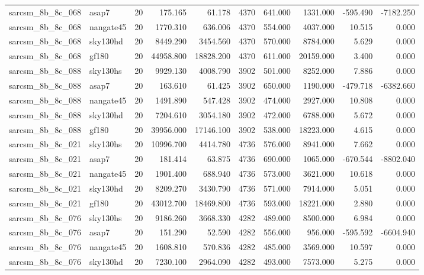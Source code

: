 \begin{longtable}{llrrrrrrrr}
sarcsm\_8b\_8c\_068 & asap7 & 20 & 175.165 & 61.178 & 4370 & 641.000 & 1331.000 & -595.490 & -7182.250 \\
sarcsm\_8b\_8c\_068 & nangate45 & 20 & 1770.310 & 636.006 & 4370 & 554.000 & 4037.000 & 10.515 & 0.000 \\
sarcsm\_8b\_8c\_068 & sky130hd & 20 & 8449.290 & 3454.560 & 4370 & 570.000 & 8784.000 & 5.629 & 0.000 \\
sarcsm\_8b\_8c\_068 & gf180 & 20 & 44958.800 & 18828.200 & 4370 & 611.000 & 20159.000 & 3.400 & 0.000 \\
sarcsm\_8b\_8c\_088 & sky130hs & 20 & 9929.130 & 4008.790 & 3902 & 501.000 & 8252.000 & 7.886 & 0.000 \\
sarcsm\_8b\_8c\_088 & asap7 & 20 & 163.610 & 61.425 & 3902 & 650.000 & 1190.000 & -479.718 & -6382.660 \\
sarcsm\_8b\_8c\_088 & nangate45 & 20 & 1491.890 & 547.428 & 3902 & 474.000 & 2927.000 & 10.808 & 0.000 \\
sarcsm\_8b\_8c\_088 & sky130hd & 20 & 7204.610 & 3054.180 & 3902 & 472.000 & 6788.000 & 5.672 & 0.000 \\
sarcsm\_8b\_8c\_088 & gf180 & 20 & 39956.000 & 17146.100 & 3902 & 538.000 & 18223.000 & 4.615 & 0.000 \\
sarcsm\_8b\_8c\_021 & sky130hs & 20 & 10996.700 & 4414.780 & 4736 & 576.000 & 8941.000 & 7.662 & 0.000 \\
sarcsm\_8b\_8c\_021 & asap7 & 20 & 181.414 & 63.875 & 4736 & 690.000 & 1065.000 & -670.544 & -8802.040 \\
sarcsm\_8b\_8c\_021 & nangate45 & 20 & 1901.400 & 688.940 & 4736 & 573.000 & 3621.000 & 10.618 & 0.000 \\
sarcsm\_8b\_8c\_021 & sky130hd & 20 & 8209.270 & 3430.790 & 4736 & 571.000 & 7914.000 & 5.051 & 0.000 \\
sarcsm\_8b\_8c\_021 & gf180 & 20 & 43012.700 & 18469.800 & 4736 & 593.000 & 18221.000 & 2.880 & 0.000 \\
sarcsm\_8b\_8c\_076 & sky130hs & 20 & 9186.260 & 3668.330 & 4282 & 489.000 & 8500.000 & 6.984 & 0.000 \\
sarcsm\_8b\_8c\_076 & asap7 & 20 & 151.290 & 52.590 & 4282 & 556.000 & 956.000 & -595.592 & -6604.940 \\
sarcsm\_8b\_8c\_076 & nangate45 & 20 & 1608.810 & 570.836 & 4282 & 485.000 & 3569.000 & 10.597 & 0.000 \\
sarcsm\_8b\_8c\_076 & sky130hd & 20 & 7230.100 & 2964.090 & 4282 & 493.000 & 7573.000 & 5.275 & 0.000 \\

\end{longtable}
